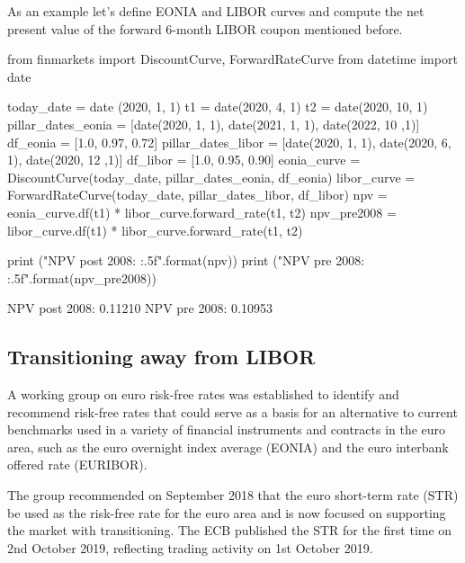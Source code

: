 %
%

As an example let's define EONIA and LIBOR curves and compute the net present value of the forward 6-month LIBOR coupon mentioned before.

\begin{ipython}
from finmarkets import DiscountCurve, ForwardRateCurve
from datetime import date

today_date = date (2020, 1, 1)
t1 = date(2020, 4, 1)
t2 = date(2020, 10, 1)
pillar_dates_eonia = [date(2020, 1, 1), date(2021, 1, 1), date(2022, 10 ,1)]
df_eonia = [1.0, 0.97, 0.72]
pillar_dates_libor = [date(2020, 1, 1), date(2020, 6, 1), date(2020, 12 ,1)]
df_libor = [1.0, 0.95, 0.90]
eonia_curve = DiscountCurve(today_date, pillar_dates_eonia, df_eonia)
libor_curve = ForwardRateCurve(today_date, pillar_dates_libor, df_libor)
npv = eonia_curve.df(t1) * libor_curve.forward_rate(t1, t2)
npv_pre2008 = libor_curve.df(t1) * libor_curve.forward_rate(t1, t2)

print ("NPV post 2008: {:.5f}".format(npv))
print ("NPV pre 2008: {:.5f}".format(npv_pre2008))
\end{ipython}
\begin{ioutput}
NPV post 2008: 0.11210
NPV pre 2008: 0.10953
\end{ioutput}

\subsection{Transitioning away from LIBOR~\cite{bib:str}}
A working group on euro risk-free rates was established to identify and recommend risk-free rates that could serve as a basis for an alternative to current benchmarks used in a variety of financial
instruments and contracts in the euro area, such as the euro overnight index average (EONIA) and the euro interbank offered rate (EURIBOR). 

The group recommended on September 2018 that the euro short-term rate (STR) be used as the risk-free rate for the euro area and is now focused on supporting the market with transitioning.
The ECB published the STR for the first time on 2nd October 2019, reflecting trading activity on 1st October 2019.


